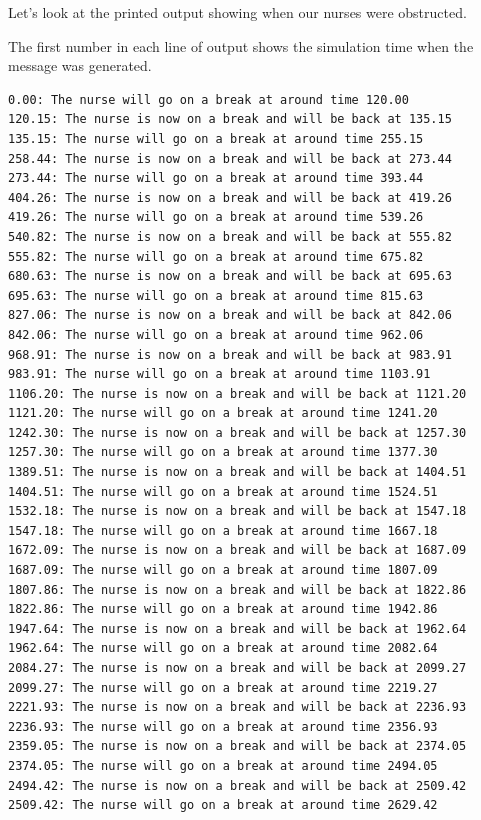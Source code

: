\documentclass[
  letterpaper,
  DIV=11,
  numbers=noendperiod]{scrreprt}
\begin{document}
Let's look at the printed output showing when our nurses were
obstructed.

The first number in each line of output shows the simulation time when
the message was generated.

\begin{verbatim}
0.00: The nurse will go on a break at around time 120.00
120.15: The nurse is now on a break and will be back at 135.15
135.15: The nurse will go on a break at around time 255.15
258.44: The nurse is now on a break and will be back at 273.44
273.44: The nurse will go on a break at around time 393.44
404.26: The nurse is now on a break and will be back at 419.26
419.26: The nurse will go on a break at around time 539.26
540.82: The nurse is now on a break and will be back at 555.82
555.82: The nurse will go on a break at around time 675.82
680.63: The nurse is now on a break and will be back at 695.63
695.63: The nurse will go on a break at around time 815.63
827.06: The nurse is now on a break and will be back at 842.06
842.06: The nurse will go on a break at around time 962.06
968.91: The nurse is now on a break and will be back at 983.91
983.91: The nurse will go on a break at around time 1103.91
1106.20: The nurse is now on a break and will be back at 1121.20
1121.20: The nurse will go on a break at around time 1241.20
1242.30: The nurse is now on a break and will be back at 1257.30
1257.30: The nurse will go on a break at around time 1377.30
1389.51: The nurse is now on a break and will be back at 1404.51
1404.51: The nurse will go on a break at around time 1524.51
1532.18: The nurse is now on a break and will be back at 1547.18
1547.18: The nurse will go on a break at around time 1667.18
1672.09: The nurse is now on a break and will be back at 1687.09
1687.09: The nurse will go on a break at around time 1807.09
1807.86: The nurse is now on a break and will be back at 1822.86
1822.86: The nurse will go on a break at around time 1942.86
1947.64: The nurse is now on a break and will be back at 1962.64
1962.64: The nurse will go on a break at around time 2082.64
2084.27: The nurse is now on a break and will be back at 2099.27
2099.27: The nurse will go on a break at around time 2219.27
2221.93: The nurse is now on a break and will be back at 2236.93
2236.93: The nurse will go on a break at around time 2356.93
2359.05: The nurse is now on a break and will be back at 2374.05
2374.05: The nurse will go on a break at around time 2494.05
2494.42: The nurse is now on a break and will be back at 2509.42
2509.42: The nurse will go on a break at around time 2629.42

\end{verbatim}
\end{document}
